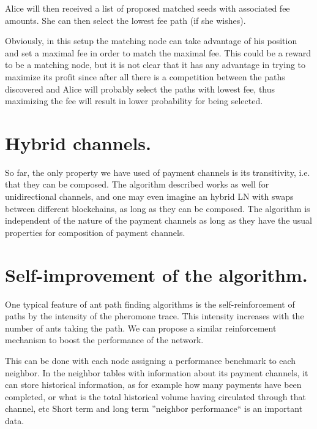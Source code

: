 \documentclass[12pt]{amsart}
\theoremstyle{remark}
\begin{document}
\medskip

Alice will then received a list of proposed matched seeds with associated fee amounts. She can then select the lowest 
fee path (if she wishes).

\medskip

Obviously, in this setup the matching node can take advantage of his position and 
set a maximal fee in order to match the maximal fee. This could be a reward to be a matching node, but it is 
not clear that it has any advantage in trying to maximize its profit since after all there is a competition
between the paths discovered and Alice will probably select the paths with lowest fee, thus maximizing the fee
will result in lower probability for being selected.



\section{Hybrid  channels.}\label{sec_hybrid}

So far, the only property we have used of payment channels is its transitivity, i.e. that they can be composed. 
The algorithm described works as well for unidirectional channels, and one may even imagine an hybrid LN with 
swaps between different blockchains, as long as they can be composed. The algorithm is 
independent of the nature of the payment channels as long as they have the usual properties 
for composition of payment channels.



\section{Self-improvement of the algorithm.}\label{sec_selfimprove}


One typical feature of ant path finding algorithms is the self-reinforcement of paths by the intensity of the 
pheromone trace. This intensity increases with the number of ants taking the path. 
We can propose a similar reinforcement mechanism to boost the performance of the network. 

\medskip

This can be done with each node assigning a performance benchmark to each neighbor. In the neighbor tables with 
information about its payment channels, it can store historical information, as for example how many 
payments have been completed, or what is the total historical volume having circulated through that channel, etc
Short term and long term ''neighbor performance`` is an important data. 
\end{document}

